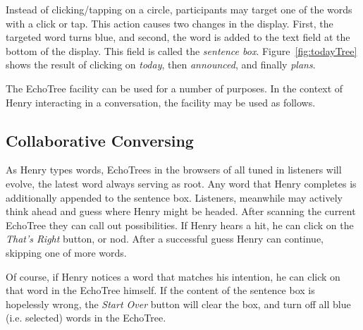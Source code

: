 \documentclass{sigchi}
\begin{document}
Instead of clicking/tapping on a circle, participants may target one
of the words with a click or tap. This action causes two changes in
the display. First, the targeted word turns blue, and second, the word
is added to the text field at the bottom of the display. This field is
called the {\em sentence box}. Figure~\ref{fig:todayTree} shows the
result of clicking on {\em today}, then {\em announced}, and finally
{\em plans}.

The EchoTree facility can be used for a number of purposes. In the
context of Henry interacting in a conversation, the facility may be
used as follows. 

\subsection{Collaborative Conversing}
As Henry types words, EchoTrees in the browsers of all tuned in
listeners will evolve, the latest word always serving as root. Any
word that Henry completes is additionally appended to the sentence
box. Listeners, meanwhile may actively think ahead and guess where
Henry might be headed. After scanning the current EchoTree they can
call out possibilities. If Henry hears a hit, he can click on the {\em
  That's Right} button, or nod. After a successful guess Henry can
continue, skipping one of more words.

Of course, if Henry notices a word that matches his intention, he can
click on that word in the EchoTree himself. If the content of the
sentence box is hopelessly wrong, the {\em Start Over} button will
clear the box, and turn off all blue (i.e. selected) words in the
EchoTree. 
\end{document}
